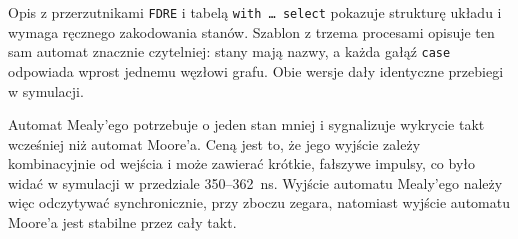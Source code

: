 \documentclass[11pt,a4paper]{article}
\begin{document}
Opis z przerzutnikami \texttt{FDRE} i tabelą \texttt{with \dots\ select} pokazuje strukturę układu i wymaga ręcznego zakodowania stanów. Szablon z trzema procesami opisuje ten sam automat znacznie czytelniej: stany mają nazwy, a każda gałąź \texttt{case} odpowiada wprost jednemu węzłowi grafu. Obie wersje dały identyczne przebiegi w symulacji.

Automat Mealy'ego potrzebuje o jeden stan mniej i sygnalizuje wykrycie takt wcześniej niż automat Moore'a. Ceną jest to, że jego wyjście zależy kombinacyjnie od wejścia i może zawierać krótkie, fałszywe impulsy, co było widać w symulacji w przedziale 350--362~ns. Wyjście automatu Mealy'ego należy więc odczytywać synchronicznie, przy zboczu zegara, natomiast wyjście automatu Moore'a jest stabilne przez cały takt.
\end{document}
